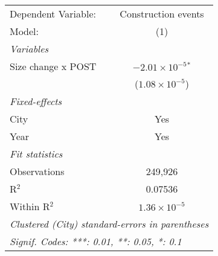 \begingroup
\centering
\begin{tabular}{lc}
   \tabularnewline \midrule \midrule
   Dependent Variable: & Construction events\\  
   Model:              & (1)\\  
   \midrule
   \emph{Variables}\\
   Size change x POST  & $-2.01\times 10^{-5}$$^{*}$\\    
                       & ($1.08\times 10^{-5}$)\\    
   \midrule
   \emph{Fixed-effects}\\
   City                & Yes\\  
   Year                & Yes\\  
   \midrule
   \emph{Fit statistics}\\
   Observations        & 249,926\\  
   R$^2$               & 0.07536\\  
   Within R$^2$        & $1.36\times 10^{-5}$\\   
   \midrule \midrule
   \multicolumn{2}{l}{\emph{Clustered (City) standard-errors in parentheses}}\\
   \multicolumn{2}{l}{\emph{Signif. Codes: ***: 0.01, **: 0.05, *: 0.1}}\\
\end{tabular}
\par\endgroup
